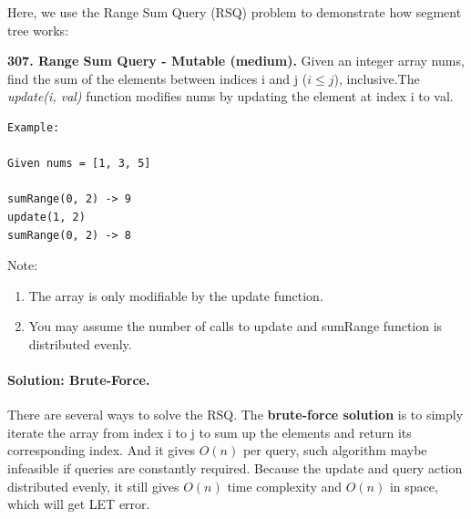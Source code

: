 \documentclass[../main.tex]{subfiles}
\begin{document}
Here, we use the Range Sum Query (RSQ) problem to demonstrate how segment tree works:
\begin{examples}[resume]
\item \textbf{307. Range Sum Query - Mutable (medium).} Given an integer array nums, find the sum of the elements between indices i and j ($i \leq j$), inclusive.The \textit{update(i, val)} function modifies nums by updating the element at index i to val.
\begin{lstlisting}[numbers=none]
Example:

Given nums = [1, 3, 5]

sumRange(0, 2) -> 9
update(1, 2)
sumRange(0, 2) -> 8
\end{lstlisting}
Note:
\begin{enumerate}
    \item 
    The array is only modifiable by the update function.
   \item  You may assume the number of calls to update and sumRange function is distributed evenly.
\end{enumerate}
\paragraph{Solution: Brute-Force.} There are several ways to solve the RSQ. The \textbf{brute-force solution} is to simply iterate the array from index i to j to sum up the elements and return its corresponding index. And it gives $O(n)$ per query, such algorithm maybe infeasible if queries are constantly required.  Because the update and query action distributed evenly, it still gives $O(n)$ time complexity and $O(n)$ in space, which will get LET error. 


\end{examples}
\end{document}
